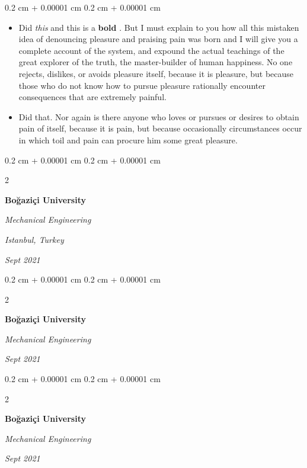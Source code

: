 \documentclass[10pt, letterpaper]{article}
\newenvironment{highlights}{
    \begin{itemize}[
        topsep=0.10 cm,
        parsep=0.10 cm,
        partopsep=0pt,
        itemsep=0pt,
        leftmargin=0.4 cm + 10pt
    ]
}{
    \end{itemize}
} %
\newenvironment{onecolentry}{
    \begin{adjustwidth}{
        0.2 cm + 0.00001 cm
    }{
        0.2 cm + 0.00001 cm
    }
}{
    \end{adjustwidth}
} %
\newenvironment{twocolentry}[2][]{
    \onecolentry
    \def\secondColumn{#2}
    \setcolumnwidth{\fill, 4.5 cm}
    \begin{paracol}{2}
}{
    \switchcolumn \raggedleft \secondColumn
    \end{paracol}
    \endonecolentry
} %
\let\hrefWithoutArrow\href
\renewcommand{\href}[2]{\hrefWithoutArrow{#1}{\ifthenelse{\equal{#2}{}}{ }{#2 }\raisebox{.15ex}{\footnotesize \faExternalLink*}}}
\begin{document}
        \vspace{0.10 cm}
        \begin{onecolentry}
            \begin{highlights}
                \item Did \textit{this} and this is a \textbf{bold} \href{https://example.com}{link}. But I must explain to you how all this mistaken idea of denouncing pleasure and praising pain was born and I will give you a complete account of the system, and expound the actual teachings of the great explorer of the truth, the master-builder of human happiness. No one rejects, dislikes, or avoids pleasure itself, because it is pleasure, but because those who do not know how to pursue pleasure rationally encounter consequences that are extremely painful.
                \item Did that. Nor again is there anyone who loves or pursues or desires to obtain pain of itself, because it is pain, but because occasionally circumstances occur in which toil and pain can procure him some great pleasure.
            \end{highlights}
        \end{onecolentry}


        \vspace{0.2 cm}

        \begin{twocolentry}{
        \textit{Istanbul, Turkey}    
            
        \textit{Sept 2021}}
            \textbf{Boğaziçi University}

            \textit{Mechanical Engineering}
        \end{twocolentry}



        \vspace{0.2 cm}

        \begin{twocolentry}{
            
            
        \textit{Sept 2021}}
            \textbf{Boğaziçi University}

            \textit{Mechanical Engineering}
        \end{twocolentry}



        \vspace{0.2 cm}

        \begin{twocolentry}{
            
            
        \textit{Sept 2021}}
            \textbf{Boğaziçi University}

            \textit{Mechanical Engineering}
        \end{twocolentry}
\end{document}
